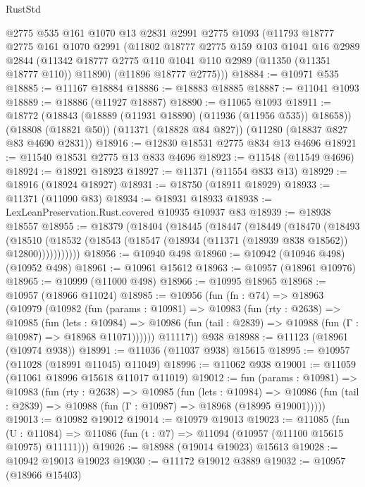 \begin{lexlean}{RustStd}
\begin{coremodule}
    @2775
    @535
    @161
    @1070
    @13
    @2831
    @2991
    @2775
    @1093
    (@11793
      @18777
      @2775
      @161
      @1070
      @2991
      (@11802
        @18777
        @2775
        @159
        @103
        @1041
        @16
        @2989
        @2844
        (@11342 @18777 @2775 @110 @1041 @110 @2989 (@11350 (@11351 @18777 @110)) @11890)
        (@11896 @18777 @2775)))
@18884 := @10971 @535
@18885 := @11167 @18884
@18886 := @18883 @18885
@18887 := @11041 @1093
@18889 := @18886 (@11927 @18887)
@18890 := @11065 @1093
@18911 := @18772
    (@18843 (@18889 (@11931 @18890) (@11936 (@11956 @535)) @18658))
    (@18808 (@18821 @50))
    (@11371 (@18828 @84 @827))
    (@11280 (@18837 @827 @83 @4690 @2831))
@18916 := @12830 @18531 @2775 @834 @13 @4696
@18921 := @11540 @18531 @2775 @13 @833 @4696
@18923 := @11548 (@11549 @4696)
@18924 := @18921 @18923
@18927 := @11371 (@11554 @833 @13)
@18929 := @18916 (@18924 @18927)
@18931 := @18750 (@18911 @18929)
@18933 := @11371 (@11090 @83)
@18934 := @18931 @18933
@18938 := LexLeanPreservation.Rust.covered @10935 @10937 @83
@18939 := @18938 @18557
@18955 := @18379
    (@18404
      (@18445
        (@18447
          (@18449
            (@18470
              (@18493
                (@18510
                  (@18532 (@18543 (@18547 (@18934 (@11371 (@18939 @838 @18562)) @12800)))))))))))
@18956 := @10940 @498
@18960 := @10942 (@10946 @498) (@10952 @498)
@18961 := @10961 @15612
@18963 := @10957 (@18961 @10976)
@18965 := @10999 (@11000 @498)
@18966 := @10995 @18965
@18968 := @10957 (@18966 @11024)
@18985 := @10956
    (fun (fn : @74) =>
    @18963
      (@10979
        (@10982
          (fun (params : @10981) =>
          @10983
            (fun (rty : @2638) =>
            @10985
              (fun (lets : @10984) =>
              @10986 (fun (tail : @2839) => @10988 (fun (Γ : @10987) => @18968 @11071))))))
        @11117))
    @938
@18988 := @11123 (@18961 (@10974 @938))
@18991 := @11036 (@11037 @938) @15615
@18995 := @10957 (@11028 (@18991 @11045) @11049)
@18996 := @11062 @938
@19001 := @11059 (@11061 @18996 @15618 @11017 @11019)
@19012 := fun (params : @10981) =>
  @10983
    (fun (rty : @2638) =>
    @10985
      (fun (lets : @10984) =>
      @10986 (fun (tail : @2839) => @10988 (fun (Γ : @10987) => @18968 (@18995 @19001)))))
@19013 := @10982 @19012
@19014 := @10979 @19013
@19023 := @11085
    (fun (U : @11084) => @11086 (fun (t : @7) => @11094 (@10957 (@11100 @15615 @10975) @11111)))
@19026 := @18988 (@19014 @19023) @15613
@19028 := @10942 @19013 @19023
@19030 := @11172 @19012 @3889
@19032 := @10957 (@18966 @15403)

\end{coremodule}
\end{lexlean}
